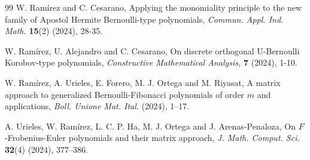 \documentclass[10pt,a4paper]{amsart}
\numberwithin{equation}{section}
\begin{document}
\begin{thebibliography}{99}
W. Ram\'irez and C. Cesarano, Applying the monomiality principle to the new family of Apostol Hermite Bernoulli-type polynomials, \textit{Commun. Appl. Ind. Math.} \textbf{15}(2) (2024), 28-35.

W. Ram\'irez, U. Alejandro and C. Cesarano, On discrete orthogonal U-Bernoulli Korobov-type polynomials, \textit{Constructive Mathematical Analysis,} \textbf{7} (2024), 1-10.

W. Ram\'irez, A. Urieles, E. Forero, M. J. Ortega and M. Riyasat, A matrix approach to generalized Bernoulli-Fibonacci polynomials of order $m$ and applications, \textit{Boll. Unione Mat. Ital.} (2024), 1–17.

A. Urieles, W. Ram\'irez, L. C. P. Ha, M. J. Ortega and J. Arenas-Penaloza, On $F$-Frobenius-Euler polynomials and their matrix approach, \textit{J. Math. Comput. Sci.} \textbf{32}(4) (2024), 377–386.

\end{thebibliography}
\end{document}
